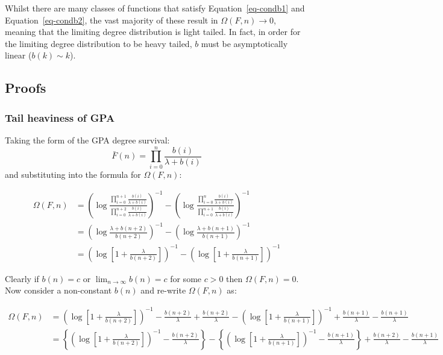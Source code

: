 \documentclass[
  sn-basic,
]{sn-jnl}
\theoremstyle{plain}
\theoremstyle{remark}
\begin{document}
Whilst there are many classes of functions that satisfy
Equation~\ref{eq-condb1} and Equation~\ref{eq-condb2}, the vast majority
of these result in \(\Omega(F,n) \rightarrow 0\), meaning that the
limiting degree distribution is light tailed. In fact, in order for the
limiting degree distribution to be heavy tailed, \(b\) must be
asymptotically linear (\(b(k)\sim k\)).

\subsection{Proofs}\label{proofs}

\subsubsection{Tail heaviness of GPA}\label{tail-heaviness-of-gpa}

Taking the form of the GPA degree survival: \[
\bar F(n) = \prod_{i=0}^n\frac{b(i)}{\lambda+b(i)}
\] and substituting into the formula for \(\Omega(F,n)\):

\begin{align*}
\Omega(F,n)&=\left(\log\frac{\prod_{i=0}^{n+1}\frac{b(i)}{\lambda+b(i)}}{\prod_{i=0}^{n+2}\frac{b(i)}{\lambda+b(i)}}\right)^{-1}-\left(\log\frac{\prod_{i=0}^{n}\frac{b(i)}{\lambda+b(i)}}{\prod_{i=0}^{n+1}\frac{b(i)}{\lambda+b(i)}}\right)^{-1}\\
&=\left(\log\frac{\lambda+b(n+2)}{b(n+2)}\right)^{-1}-\left(\log\frac{\lambda+b(n+1)}{b(n+1)}\right)^{-1}\\
&=\left(\log\left[1+\frac{\lambda}{b(n+2)}\right]\right)^{-1}-\left(\log\left[1+\frac{\lambda}{b(n+1)}\right]\right)^{-1}
\end{align*}

Clearly if \(b(n)=c\) or \(\lim_{n\rightarrow\infty}b(n)=c\) for some
\(c>0\) then \(\Omega(F,n)=0\). Now consider a non-constant \(b(n)\) and
re-write \(\Omega(F,n)\) as:

\begin{align*}
\Omega(F,n) &= \left(\log\left[1+\frac{\lambda}{b(n+2)}\right]\right)^{-1}-\frac{b(n+2)}{\lambda}+\frac{b(n+2)}{\lambda}-\left(\log\left[1+\frac{\lambda}{b(n+1)}\right]\right)^{-1}+\frac{b(n+1)}{\lambda}  -\frac{b(n+1)}{\lambda}\\
&=\left\{ \left(\log\left[1+\frac{\lambda}{b(n+2)}\right]\right)^{-1}-\frac{b(n+2)}{\lambda}\right\} - \left\{ \left(\log\left[1+\frac{\lambda}{b(n+1)}\right]\right)^{-1}-\frac{b(n+1)}{\lambda}\right\}+\frac{b(n+2)}{\lambda}-\frac{b(n+1)}{\lambda}
\end{align*}
\end{document}

